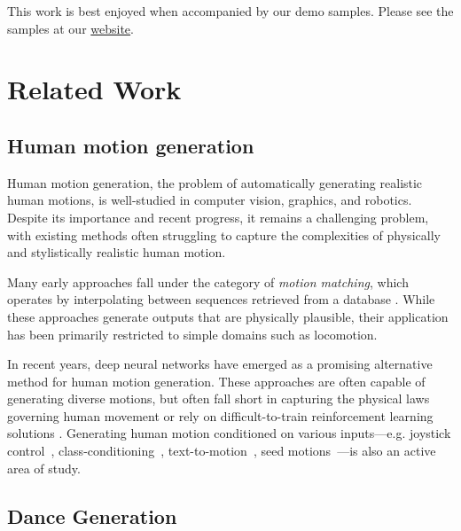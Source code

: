 \documentclass[10pt,twocolumn,letterpaper]{article}
\newcommand{\websitelink}{https://edge-dance.github.io/}
\newcommand{\website}{\href{\websitelink}{website}}
\begin{document}
\vspace{5pt}
This work is best enjoyed when accompanied by our demo samples.
Please see the samples at our \website.

\section{Related Work}
\label{sec:related_work}

\subsection{Human motion generation}

Human motion generation, the problem of automatically generating realistic human motions, is well-studied in computer vision, graphics, and robotics.
Despite its importance and recent progress, it remains a challenging problem, with existing methods often struggling to capture the complexities of physically and stylistically realistic human motion.

Many early approaches fall under the category of \textit{motion matching}, which operates by interpolating between sequences retrieved from a database \cite{holden2020learned}.
While these approaches generate outputs that are physically plausible, their application has been primarily restricted to simple domains such as locomotion.

In recent years, deep neural networks have emerged as a promising alternative method for human motion generation.
These approaches are often capable of generating diverse motions, but often fall short in capturing the physical laws governing human movement or rely on difficult-to-train reinforcement learning solutions \cite{ling2020character, won2022physics}.
Generating human motion conditioned on various inputs---e.g. joystick control~\cite{ling2020character}, class-conditioning~\cite{guo2020action2motion,petrovich2021action}, text-to-motion~\cite{zhang2022motiondiffuse, petrovich2022temos}, seed motions~\cite{rempe2021humor,holden2016deep,duan2022unified,yin2022dance}---is also an active area of study.

\subsection{Dance Generation}
\end{document}
